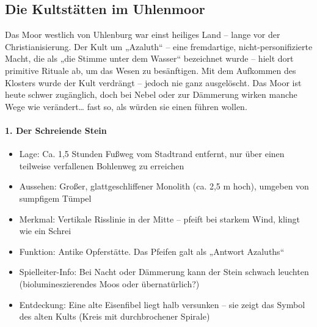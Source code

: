 \subsection{Die Kultstätten im Uhlenmoor}
Das Moor westlich von Uhlenburg war einst heiliges Land – lange vor der Christianisierung. Der Kult um „Azaluth“ – eine fremdartige, nicht-personifizierte Macht, die als „die Stimme unter dem Wasser“ bezeichnet wurde – hielt dort primitive Rituale ab, um das Wesen zu besänftigen. Mit dem Aufkommen des Klosters wurde der Kult verdrängt – jedoch nie ganz ausgelöscht.
Das Moor ist heute schwer zugänglich, doch bei Nebel oder zur Dämmerung wirken manche Wege wie verändert… fast so, als würden sie einen führen wollen.

\paragraph{1. Der Schreiende Stein}
\begin{itemize}
\item Lage: Ca. 1,5 Stunden Fußweg vom Stadtrand entfernt, nur über einen teilweise verfallenen Bohlenweg zu erreichen
\item Aussehen: Großer, glattgeschliffener Monolith (ca. 2,5 m hoch), umgeben von sumpfigem Tümpel
\item Merkmal: Vertikale Risslinie in der Mitte – pfeift bei starkem Wind, klingt wie ein Schrei
\item Funktion: Antike Opferstätte. Das Pfeifen galt als „Antwort Azaluths“
\item Spielleiter-Info: Bei Nacht oder Dämmerung kann der Stein schwach leuchten (biolumineszierendes Moos oder übernatürlich?)
\item Entdeckung: Eine alte Eisenfibel liegt halb versunken – sie zeigt das Symbol des alten Kults (Kreis mit durchbrochener Spirale)
\end{itemize}
    
